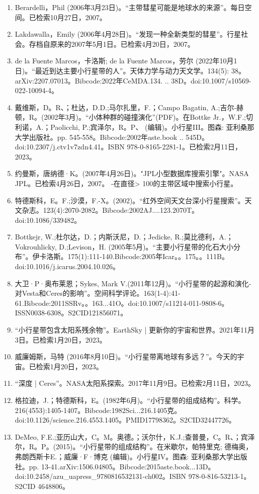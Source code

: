 \begin{enumerate}
\item Berardelli，Phil (2006年3月23日)。“主带彗星可能是地球水的来源”。每日空间。已检索10月27日，2007。
\item Lakdawalla，Emily (2006年4月28日)。“发现一种全新类型的彗星”。行星社会。存档自原来的2007年5月1日。已检索4月20日，2007。
\item de la Fuente Marcos，卡洛斯; de la Fuente Marcos，劳尔 (2022年10月1日)。“最近到达主要小行星带的人”。天体力学与动力天文学。134(5): 38。arXiv:2207.07013。Bibcode:2022年CeMDA.134. .. 38D。doi:10.1007/s10569-022-10094-4。
\item 戴维斯，D。R、；杜达，D.D.;马尔扎里，F.；Campo Bagatin, A.;吉尔-赫顿，R。(2002年3月)。“小体种群的碰撞演化”(PDF)。在Bottke Jr.，W.F.;切利诺，A.；Paolicchi, P.;宾泽尔，R。P、 (编辑)。小行星III。图森: 亚利桑那大学出版社。pp. 545-558。Bibcode:2002年aste.book .. 545D。doi:10.2307/j.ctv1v7zdn4.41。ISBN  978-0-8165-2281-1。已检索2月11日，2023。
\item 约曼斯，唐纳德·K。(2007年4月26日)。"JPL小型数据库搜索引擎"。NASA JPL。已检索4月26日，2007。 -在直径> 100的主带区域中搜索小行星。
\item 特德斯科，E。F.;沙漠，F.-X。(2002)。“红外空间天文台深小行星搜索”。天文杂志。123(4):2070-2082。Bibcode:2002AJ....123.2070T。doi:10.1086/339482。
\item Bottkejr, W.;杜尔达，D.；内斯沃尼，D.；Jedicke, R.;莫比德利，A.；Vokrouhlicky, D.;Levison，H. (2005年5月)。“主要小行星带的化石大小分布”。伊卡洛斯。175(1):111-140.Bibcode:2005年Icar。。175。。111B。doi:10.1016/j.icarus.2004.10.026。
\item 大卫·P·奥布莱恩；Sykes, Mark V.(2011年12月)。“小行星带的起源和演化-对Vesta和Ceres的影响”。空间科学评论。163(1-4):41-61.Bibcode:2011SSRv。。163...41O。doi:10.1007/s11214-011-9808-6。ISSN0038-6308。S2CID121856071。  
\item “小行星带包含太阳系残余物”。EarthSky | 更新你的宇宙和世界。2021年11月3日。已检索1月20日，2023。
\item 威廉姆斯，马特 (2016年8月10日)。“小行星带离地球有多远？”。今天的宇宙。已检索1月20日，2023。
\item “深度 | Ceres”。NASA太阳系探索。2017年11月9日。已检索2月11日，2023。
\item 格拉迪，J.；特德斯科，E。(1982年6月)。“小行星带的组成结构”。科学。216(4553):1405-1407。Bibcode:1982Sci...216.1405克。doi:10.1126/science.216.4553.1405。PMID17798362。S2CID32447726。  
\item DeMeo, F.E.;亚历山大，C。M。奥德。；沃尔什，K.J.;查普曼，C。R、；宾泽尔，R。P。(2015)。“小行星带的组成结构”。在米歇尔，帕特里克; 德梅奥，弗朗西斯卡E.；威廉·F·博克 (编辑)。小行星IV。图森: 亚利桑那大学出版社。pp. 13-41.arXiv:1506.04805。Bibcode:2015aste.book...13D。doi:10.2458/azu_uapress_9780816532131-ch002。ISBN 978-0-816-53213-1。S2CID 4648806。

\end{enumerate}
